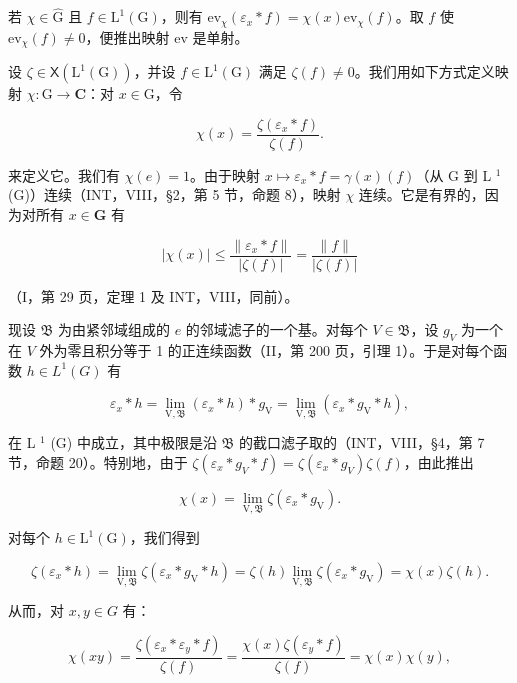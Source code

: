 若 \(\chi \in \widehat{\mathrm{G}}\) 且 \(f \in \mathrm{L}^1(\mathrm{G})\)，则有 \(\mathrm{ev}_{\chi}(\varepsilon_x * f) = \chi(x)\mathrm{ev}_{\chi}(f)\)。取 \(f\) 使 \(\mathrm{ev}_{\chi}(f) \neq 0\)，便推出映射 ev 是单射。

设 \(\zeta\in\mathsf{X}(\mathrm{L}^{1}(\mathrm{G}))\)，并设 \(f\in\mathrm{L}^{1}(\mathrm{G})\) 满足 \(\zeta(f)\neq0\)。我们用如下方式定义映射 \(\chi\colon\mathrm{G}\to\mathbf{C}\)：对 \(x\in\mathrm{G}\)，令

\[
\chi (x) = \frac {\zeta (\varepsilon_ {x} * f)}{\zeta (f)}.\tag{3}
\]

来定义它。我们有 \(\chi(e) = 1\)。由于映射 \(x \mapsto \varepsilon_x * f = \gamma(x)(f)\)（从 G 到 L \(^1\) (G)）连续（INT，VIII，§2，第 5 节，命题 8），映射 \(\chi\) 连续。它是有界的，因为对所有 \(x \in \mathbf{G}\) 有

\[
| \chi (x) | \leqslant \frac {\| \varepsilon_ {x} * f \|}{| \zeta (f) |} = \frac {\| f \|}{| \zeta (f) |}
\]

（I，第 29 页，定理 1 及 INT，VIII，同前）。

现设 \(\mathfrak{B}\) 为由紧邻域组成的 \(e\) 的邻域滤子的一个基。对每个 \(V \in \mathfrak{B}\)，设 \(g_V\) 为一个在 \(V\) 外为零且积分等于 1 的正连续函数（II，第 200 页，引理 1）。于是对每个函数 \(h \in L^1(G)\) 有

\[
\varepsilon_ {x} * h = \lim _ {\mathrm{V}, \mathfrak {B}} (\varepsilon_ {x} * h) * g _ {\mathrm{V}} = \lim _ {\mathrm{V}, \mathfrak {B}} (\varepsilon_ {x} * g _ {\mathrm{V}} * h),
\]

在 L \(^{1}\) (G) 中成立，其中极限是沿 \(\mathfrak{B}\) 的截口滤子取的（INT，VIII，§4，第 7 节，命题 20）。特别地，由于 \(\zeta(\varepsilon_x * g_V * f) = \zeta(\varepsilon_x * g_V)\zeta(f)\)，由此推出

\[
\chi (x) = \lim _ {\mathrm{V}, \mathfrak {B}} \zeta (\varepsilon_ {x} * g _ {\mathrm{V}}).
\]

对每个 \(h\in \mathrm{L}^1 (\mathrm{G})\)，我们得到

\[
\zeta (\varepsilon_ {x} * h) = \lim _ {\mathrm{V}, \mathfrak {B}} \zeta (\varepsilon_ {x} * g _ {\mathrm{V}} * h) = \zeta (h) \lim _ {\mathrm{V}, \mathfrak {B}} \zeta (\varepsilon_ {x} * g _ {\mathrm{V}}) = \chi (x) \zeta (h).
\]

从而，对 \(x, y \in G\) 有：

\[
\chi (x y) = \frac {\zeta (\varepsilon_ {x} * \varepsilon_ {y} * f)}{\zeta (f)} = \frac {\chi (x) \zeta (\varepsilon_ {y} * f)}{\zeta (f)} = \chi (x) \chi (y),
\]

